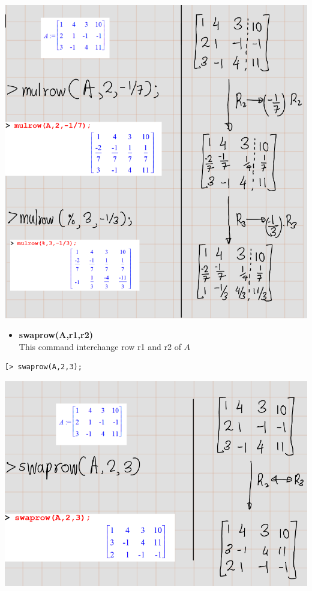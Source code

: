 \documentclass[
]{book}
\providecommand{\tightlist}{%
  \setlength{\itemsep}{0pt}\setlength{\parskip}{0pt}}
\theoremstyle{definition}
\theoremstyle{definition}
\theoremstyle{definition}
\theoremstyle{definition}
\theoremstyle{remark}
\begin{document}
\includegraphics{figures/Lesson 4/fig10.png}

\begin{itemize}
\tightlist
\item
  \textbf{swaprow(A,r1,r2)}\\
  This command interchange row r1 and r2 of \(A\)
\end{itemize}

\begin{verbatim}
[> swaprow(A,2,3);
\end{verbatim}

\includegraphics{figures/Lesson 4/fig11.png}
\end{document}
